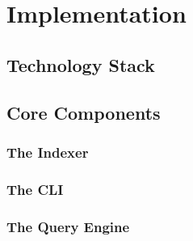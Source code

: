 \chapter{Implementation}
\label{chap:implementation}

\section{Technology Stack}
\label{sec:tech-stack}

\section{Core Components}
\label{sec:components}

\subsection{The Indexer}

\subsection{The CLI}

\subsection{The Query Engine}
